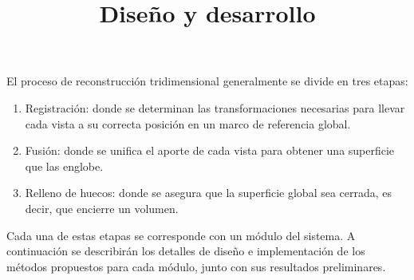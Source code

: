 \documentclass{pfc}
\title{Diseño y desarrollo}
\begin{document}
	\maketitle
	El proceso de reconstrucción tridimensional generalmente se divide en tres etapas:
	\begin{enumerate}
		\item Registración: donde se determinan las transformaciones necesarias
			para llevar cada vista a su correcta posición en un marco de
			referencia global.
		\item Fusión: donde se unifica el aporte de cada vista para obtener una
			superficie que las englobe.
		\item Relleno de huecos: donde se asegura que la superficie global sea
			cerrada, es decir, que encierre un volumen.
	\end{enumerate}
	Cada una de estas etapas se corresponde con un módulo del sistema.
	A continuación se describirán los detalles de diseño e implementación de
	los métodos propuestos para cada módulo, junto con sus resultados
	preliminares.

	
	
	
	
	
\end{document}
